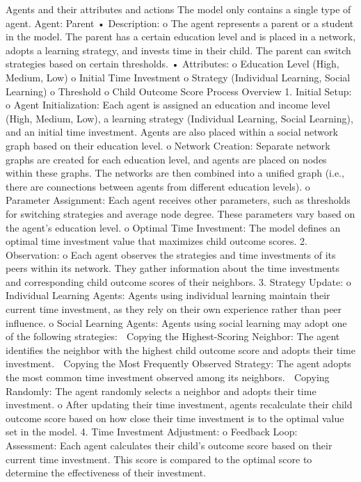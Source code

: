 Agents and their attributes and actions
The model only contains a single type of agent.
Agent: Parent
•	Description:
o	The agent represents a parent or a student in the model. The parent has a certain education level and is placed in a network, adopts a learning strategy, and invests time in their child. The parent can switch strategies based on certain thresholds.
•	Attributes:
o	Education Level (High, Medium, Low)
o	Initial Time Investment 
o	Strategy (Individual Learning, Social Learning)
o	Threshold 
o	Child Outcome Score 
Process Overview
1.	Initial Setup:
o	Agent Initialization: Each agent is assigned an education and income level (High, Medium, Low), a learning strategy (Individual Learning, Social Learning), and an initial time investment. Agents are also placed within a social network graph based on their education level.
o	Network Creation: Separate network graphs are created for each education level, and agents are placed on nodes within these graphs. The networks are then combined into a unified graph (i.e., there are connections between agents from different education levels).
o	Parameter Assignment: Each agent receives other parameters, such as thresholds for switching strategies and average node degree. These parameters vary based on the agent's education level.
o	Optimal Time Investment: The model defines an optimal time investment value that maximizes child outcome scores.
2.	Observation:
o	Each agent observes the strategies and time investments of its peers within its network. They gather information about the time investments and corresponding child outcome scores of their neighbors.
3.	Strategy Update:
o	Individual Learning Agents: Agents using individual learning maintain their current time investment, as they rely on their own experience rather than peer influence.
o	Social Learning Agents: Agents using social learning may adopt one of the following strategies:
	Copying the Highest-Scoring Neighbor: The agent identifies the neighbor with the highest child outcome score and adopts their time investment.
	Copying the Most Frequently Observed Strategy: The agent adopts the most common time investment observed among its neighbors.
	Copying Randomly: The agent randomly selects a neighbor and adopts their time investment.
o	After updating their time investment, agents recalculate their child outcome score based on how close their time investment is to the optimal value set in the model.
4.	Time Investment Adjustment:
o	Feedback Loop:
	Assessment: Each agent calculates their child's outcome score based on their current time investment. This score is compared to the optimal score to determine the effectiveness of their investment.
